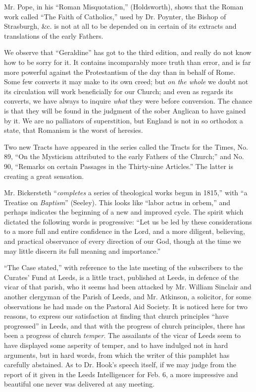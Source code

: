 Mr. Pope, in his ``Roman Misquotation,'' (Holdsworth),
shows that the Roman work called ``The Faith of Catholics,'' used by Dr.
Poynter, the Bishop of Strasburgh, \&c. is not at all to be depended
on in certain of its extracts and translations of the early Fathers.

We observe that ``Geraldine'' has got to the third
edition, and really do not know how to be sorry for it. It contains
incomparably more truth than error, and is far more powerful against the
Protestantism of the day than in behalf of Rome. Some few converts it
may make to its own creed; but \emph{on the whole} we doubt not its
circulation will work beneficially for our Church; and even as regards
its converts, we have always to inquire \emph{what} they were before
conversion. The chance is that they will be found in the judgment of the
sober Anglican to have gained by it. We are no palliators of
superstition, but England is not in so orthodox a state, that Romanism
is the worst of heresies.

Two new Tracts have appeared in the series called
the Tracts for the Times, No. 89, ``On the Mysticism attributed to the
early Fathers of the Church;'' and No.
90, ``Remarks on certain Passages in the Thirty-nine Articles.'' The
latter is creating a great sensation.

Mr. Bickersteth ``\emph{completes} a series of
theological works begun in 1815,'' with ``a Treatise on \emph{Baptism}''
(Seeley). This looks like ``labor actus in orbem,'' and perhaps indicates
the beginning of a new and improved cycle. The spirit which dictated the
following words is progressive: ``Let us be led by these considerations
to a more full and entire confidence in the Lord, and a more diligent,
believing, and practical observance of every direction of our God,
though at the time we may little discern its full meaning and
importance.''

``The Case stated,'' with reference to the late
meeting of the subscribers to the Curates' Fund at Leeds, is a little
tract, published at Leeds, in defence of the vicar of that parish, who
it seems had been attacked by Mr. William Sinclair and another clergyman
of the Parish of Leeds, and Mr. Atkinson, a solicitor, for some
observations he had made on the Pastoral Aid Society. It is noticed here
for two reasons, to express our satisfaction at finding that church
principles ``have progressed'' in Leeds, and that with the progress of
church principles, there has been a progress of church \emph{temper}.
The assailants of the vicar of Leeds seem to have displayed some
asperity of temper, and to have indulged not in hard arguments, but in
hard words, from which the writer of this pamphlet has carefully
abstained. As to Dr. Hook's speech itself, if we may judge from the
report of it given in the Leeds Intelligencer for Feb. 6, a more
impressive and beautiful one never was delivered at any meeting.

